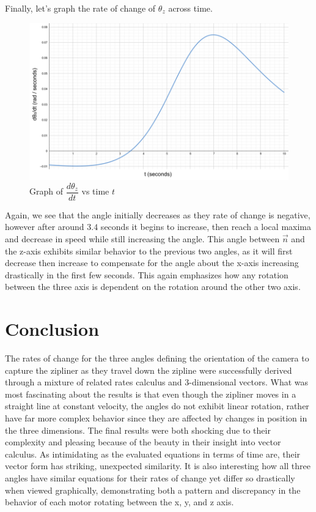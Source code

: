 \documentclass[12pt]{article}
\begin{document}
\newpage

Finally, let's graph the rate of change of $\theta_z$ across time. 
\begin{figure}[H]
\centering
\includegraphics[width=500pt]{img/graph3.png}
\caption{\label{fig:5}Graph of $\dfrac{d\theta_z}{dt}$ vs time $t$}
\end{figure}

Again, we see that the angle initially decreases as they rate of change is negative, however after around $3.4$ seconds it begins to increase, then reach a local maxima and decrease in speed while still increasing the angle. This angle between $\vec n$ and the z-axis exhibits similar behavior to the previous two angles, as it will first decrease then increase to compensate for the angle about the x-axis increasing drastically in the first few seconds. This again emphasizes how any rotation between the three axis is dependent on the rotation around the other two axis.

\section{Conclusion}
The rates of change for the three angles defining the orientation of the camera to capture the zipliner as they travel down the zipline were successfully derived through a mixture of related rates calculus and 3-dimensional vectors. What was most fascinating about the results is that even though the zipliner moves in a straight line at constant velocity, the angles do not exhibit linear rotation, rather have far more complex behavior since they are affected by changes in position in the three dimensions. The final results were both shocking due to their complexity and pleasing because of the beauty in their insight into vector calculus. As intimidating as the evaluated equations in terms of time are, their vector form has striking, unexpected similarity. It is also interesting how all three angles have similar equations for their rates of change yet differ so drastically when viewed graphically, demonstrating both a pattern and discrepancy in the behavior of each motor rotating between the x, y, and z axis.
\end{document}
